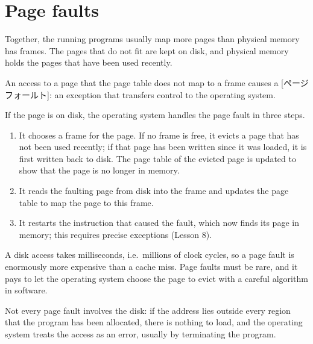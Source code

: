 \documentclass[../main.tex]{subfiles}
\begin{document}
\section{Page faults}
\label{sec:l13-page-faults}

Together, the running programs usually map more pages than physical memory has
frames.  The pages that do not fit are
kept on disk, and physical memory holds the pages that have been used
recently.

\begin{definition}
  An access to a page that the page table does not map to a frame causes a
  [ページフォールト]: an exception that transfers control to
  the operating system.
\end{definition}

If the page is on disk, the operating system handles the page fault in three
steps.
\begin{enumerate}
  \item It chooses a frame for the page.  If no frame is free, it evicts a page
    that has not been used recently; if that page has been written since it
    was loaded, it is first written back to disk.  The page table of the
    evicted page is updated to show that the page is no longer in memory.
  \item It reads the faulting page from disk into the frame and updates the
    page table to map the page to this frame.
  \item It restarts the instruction that caused the fault, which now finds its
    page in memory; this requires precise exceptions (Lesson 8).
\end{enumerate}

A disk access takes milliseconds, i.e.\ millions of clock cycles, so a page
fault is enormously more expensive than a cache miss.  Page faults must be
rare, and it pays to let the operating system choose the page to evict with a
careful algorithm in software.

Not every page fault involves the disk: if the address lies outside every
region that the program has been allocated, there is nothing to load, and the
operating system treats the access as an error, usually by terminating the
program.
\end{document}
